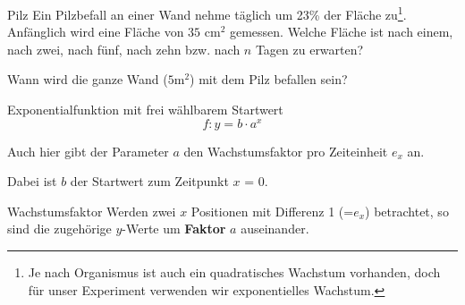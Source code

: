 \begin{beispiel}{Pilz}{}
  Ein Pilzbefall an einer Wand nehme täglich um 23\% der Fläche
  zu\footnote{Je nach Organismus ist auch ein quadratisches Wachstum
  vorhanden, doch für unser Experiment verwenden wir exponentielles Wachstum.}.
  Anfänglich wird eine Fläche von $35$ $\text{cm}^2$ gemessen.
  Welche Fläche ist nach einem, nach zwei, nach fünf, nach zehn
  bzw. nach $n$ 
  Tagen zu erwarten?


  Wann wird die ganze Wand ($5 \text{m}^2$) mit dem Pilz befallen
  sein?
  

\end{beispiel}

\newpage


\begin{gesetz}{Exponentialfunktion mit frei wählbarem Startwert}{}
$$f: y = b\cdot{}a^x$$

Auch hier gibt der Parameter $a$ den Wachstumsfaktor pro Zeiteinheit $e_x$ an.

Dabei ist $b$ der Startwert zum Zeitpunkt $x$ = 0.
\end{gesetz}



\begin{bemerkung}{Wachstumsfaktor}{}{}
Werden zwei $x$ Positionen mit Differenz 1 (=$e_x$) betrachtet, so sind
die zugehörige $y$-Werte um \textbf{Faktor} $a$ auseinander.
\end{bemerkung}

